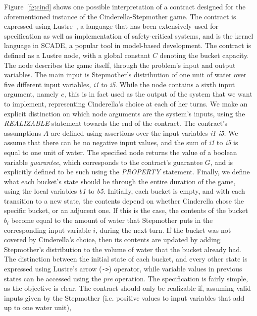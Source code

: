 Figure~\ref{fg:cind} shows one possible interpretation of a contract designed
for the aforementioned instance of the Cinderella-Stepmother game. The contract
is expressed using Lustre~\cite{lustrev6}, a language
that has been extensively used for specification as well as implementation of
safety-critical systems, and is the kernel language in SCADE, a popular tool in
model-based development. The contract is defined as a Lustre node, with a global
constant $C$ denoting the bucket capacity. The node describes the game itself,
through the problem's input and output variables. The main input is Stepmother's
distribution of one unit of water over five different input variables,
\textit{i1} to \textit{i5}. While the node contains a sixth input argument,
namely $e$, this is in fact used as the output of the system that we want to
implement, representing Cinderella's choice at each of her turns. We make an
explicit distinction on which node arguments are the system's inputs, using the \textit{REALIZABLE} statement towards the end of the contract. The contract's
assumptions $A$ are defined using assertions over the input variables
\textit{i1-i5}. We assume that there can be no negative input values, and the
sum of \textit{i1} to \textit{i5} is equal to one unit of water. The specified node
returns the value of a boolean variable \textit{guarantee}, which corresponds to
the contract's guarantee $G$, and is explicitly defined to be such using the
\textit{PROPERTY} statement.
Finally, we define what each bucket's state should be through the entire
duration of the game, using the local variables \textit{b1} to \textit{b5}.
Initially, each bucket is empty, and with each transition to a new state, the contents depend on
whether Cinderella chose the specific bucket, or an adjucent one. If this is the
case, the contents of the bucket $b_i$ become equal to the amount of water that
Stepmother puts in the corresponding input variable $i$, during the next turn.
If the bucket was not covered by Cinderella's choice, then its contents are
updated by adding Stepmother's distribution to the volume of water that the
bucket already had. The distinction between the initial state of each bucket,
and every other state is expressed using Lustre's arrow (\texttt{->})
operator, while variable values in previous states can be accessed using the
\textit{pre} operation.
The specification is fairly simple, as the objective is clear. The contract
should only be realizable if, assuming valid inputs given by the Stepmother
(i.e. positive values to input variables that add up to one water unit),
